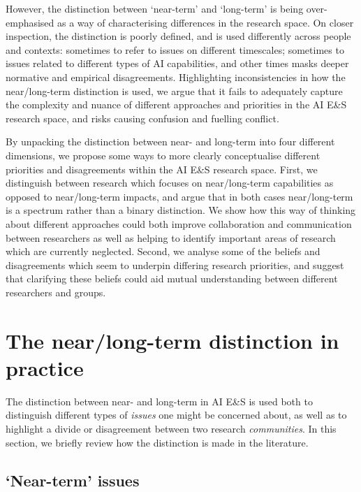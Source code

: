 \documentclass[sigconf]{acmart}
\begin{document}
However, the distinction between `near-term' and `long-term' is being over-emphasised as a way of characterising differences in the research space. On closer inspection, the distinction is poorly defined, and is used differently across people and contexts: sometimes to refer to issues on different timescales; sometimes to issues related to different types of AI capabilities, and other times masks deeper normative and empirical disagreements. Highlighting inconsistencies in how the near/long-term distinction is used, we argue that it fails to adequately capture the complexity and nuance of different approaches and priorities in the AI E\&S research space, and risks causing confusion and fuelling conflict.

By unpacking the distinction between near- and long-term into four different dimensions, we propose some ways to more clearly conceptualise different priorities and disagreements within the AI E\&S research space. First, we distinguish between research which focuses on near/long-term capabilities as opposed to near/long-term impacts, and argue that in both cases near/long-term is a spectrum rather than a binary distinction. We show how this way of thinking about different approaches could both improve collaboration and communication between researchers as well as helping to identify important areas of research which are currently neglected. Second, we analyse some of the beliefs and disagreements which seem to underpin differing research priorities, and suggest that clarifying these beliefs could aid mutual understanding between different researchers and groups.


\section{The near/long-term distinction in practice}
The distinction between near- and long-term in AI E\&S is used both to distinguish different types of \textit{issues} one might be concerned about, as well as to highlight a divide or disagreement between two research \textit{communities}. In this section, we briefly review how the distinction is made in the literature.

\subsection{`Near-term' issues}
\end{document}

